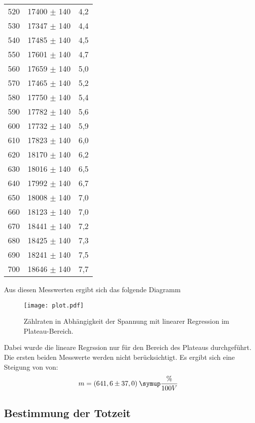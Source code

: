\begin{table}[H]
\begin{tabular}{c c c}
    520 &	17400 $\pm$ 140 &	4,2 \\
    530 &	17347 $\pm$ 140 &	4,4 \\
    540 &	17485 $\pm$ 140 &	4,5 \\
    550 &	17601 $\pm$ 140 &	4,7 \\
    560 &	17659 $\pm$ 140 &	5,0 \\
    570 &	17465 $\pm$ 140 &	5,2 \\
    580 &	17750 $\pm$ 140 &	5,4 \\
    590 &	17782 $\pm$ 140 &	5,6 \\
    600 &	17732 $\pm$ 140 &	5,9 \\
    610 &	17823 $\pm$ 140 &	6,0 \\
    620 &	18170 $\pm$ 140 &	6,2 \\
    630 &	18016 $\pm$ 140 &	6,5 \\
    640 &	17992 $\pm$ 140 &	6,7 \\
    650 &	18008 $\pm$ 140 &	7,0 \\
    660 &	18123 $\pm$ 140 &	7,0 \\
    670 &	18441 $\pm$ 140 &	7,2 \\
    680 &	18425 $\pm$ 140 &	7,3 \\
    690 &	18241 $\pm$ 140 &	7,5 \\
    700 &	18646 $\pm$ 140 &	7,7 \\
    \bottomrule
  \end{tabular}
\end{table}

Aus diesen Messwerten ergibt sich das folgende Diagramm

\begin{figure}
  \centering
  \texttt{[image: plot.pdf]}
  \caption{Zählraten in Abhängigkeit der Spannung mit linearer Regression im Plateau-Bereich.}
  \label{fig:plot}
\end{figure}

Dabei wurde die lineare Regrssion nur für den Bereich des Plateaus durchgeführt. Die ersten beiden
Messwerte werden nicht berücksichtigt.
Es ergibt sich eine Steigung von von:
\begin{equation*}
  m = (641,6 \pm 37,0) \: \symup{\frac{\%}{100V}}
\end{equation*}








\subsection{Bestimmung der Totzeit}

